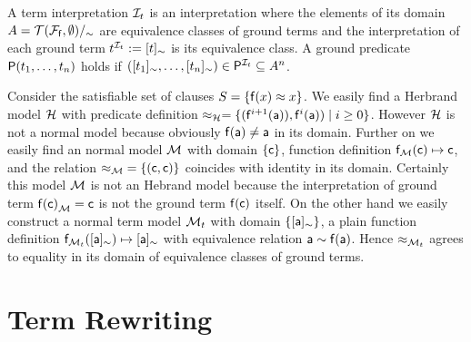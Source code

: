 \begin{definition}
	A {\myem term interpretation} 
	${\mathcal I}_t$ 
	is an interpretation 
	where the elements of its domain $A = {{\mathcal T}({\mathcal F}_{\mathsf f},\emptyset)}/_\sim$ 
	are equivalence classes of ground terms
	and the interpretation of each ground term $t^{{\mathcal I}_t} := [t]_\sim$ is its equivalence class.
	A ground predicate ${\mathsf P}(t_1,\ldots,t_n)$ holds if 
	$([t_1]_\sim,\ldots,[t_n]_\sim) \in {\mathsf P}^{{\mathcal I}_t} \subseteq A^n$.
\end{definition}


\begin{example}
	Consider the satisfiable set of clauses $S = \{ {\mathsf f}(x) \approx x \}$. 
	We easily find a Herbrand model ${\mathcal H}$ with
	predicate definition $\approx_{\mathcal H} = \{ ({\mathsf f}^{i+1}({\mathsf a})), {\mathsf f}^{i}({\mathsf a})) \mid i\geq 0  \} $. 
	However ${\mathcal H}$ is not a normal model because obviously ${\mathsf f}({\mathsf a})\neq{\mathsf a}$ in its domain.
	Further on we easily find an normal model ${\mathcal M}$ 
	with domain $\{ {\mathsf c} \}$, function definition ${\mathsf f}_{\mathcal M}({\mathsf c}) \mapsto {\mathsf c}$, 
	and the relation ${\approx_{\mathcal M}} = \{ ({\mathsf c},{\mathsf c})\}$ coincides with identity in its domain.
	Certainly this model ${\mathcal M}$ is not an Hebrand model 
	because the interpretation of ground term ${{\mathsf f}({\mathsf c})}_{\mathcal M} = {\mathsf c}$ is not the ground term ${\mathsf f}({\mathsf c})$ itself.
	On the other hand we easily construct a normal term model ${\mathcal M}_t$ with domain $\{ [{\mathsf a}]_\sim\}$, 
	a plain function definition
	${\mathsf f}_{{\mathcal M}_t}([{\mathsf a}]_\sim) \mapsto [{\mathsf a}]_\sim$ 
	with equivalence relation
	${\mathsf a} \sim {\mathsf f}({\mathsf a})$.
	Hence $\approx_{{\mathcal M}_t}$ agrees to equality in its domain of equivalence classes of ground terms.	
\end{example}



\section{Term Rewriting}\label{sec:termrewriting}


